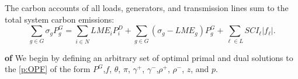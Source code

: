 \documentclass[10pt,a4paper]{amsart}
\renewenvironment{proof}[1]{\par\medskip\noindent\textbf{#1}\enspace\ignorespaces}{\par\medskip}
\begin{document}
\begin{theorem} \label{thm:carbonfootprint}
The carbon accounts of all loads, generators, and transmission lines sum to the total system carbon emissions:
\begin{equation} \label{eq:carbonfootprint}
    \sum_{g \in G} \sigma_g P^G_g = \sum_{i \in N}LME_i P^D_i + \sum_{g \in G}(\sigma_g - LME_g) P^G_g + \sum_{\ell \in L} SCI_\ell |f_\ell|.
\end{equation}
\end{theorem}

\begin{proof}{of }
    We begin by defining an arbitrary set of optimal primal and dual solutions to the \ref{p:OPF} of the form $P^G$,$f$, $\theta$, $\pi$, $\gamma^+$, $\gamma^-$,$\rho^+$, $\rho^-$, $z$, and $p$.

\end{proof}
\end{document}
